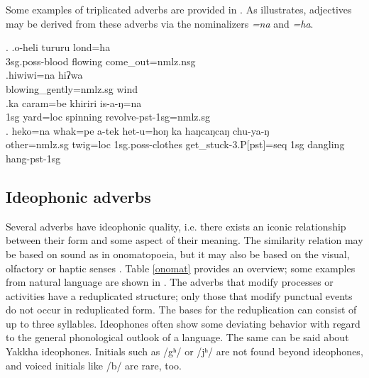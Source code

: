 Some examples of triplicated adverbs are provided in \Next. As \Next[b] illustrates, adjectives may be derived from these adverbs via the nominalizers \emph{=na} and \emph{=ha}.  

 \ex. \ag.o-heli tururu lond=ha\\	
	{\sc 3sg.poss}-blood flowing	come\_out{\sc [pst]=nmlz.nsg}	\\
	 \bg.hiwiwi=na hiʔwa\\
	blowing\_gently{\sc =nmlz.sg}	wind\\
	 \bg.ka caram=be khiriri is-a-ŋ=na \\
		{\sc 1sg}	yard{\sc =loc} spinning 	revolve{\sc -pst-1sg=nmlz.sg}\\
	 \bg. heko=na         whak=pe      a-tek              het-u=hoŋ              ka  haŋcaŋcaŋ chu-ya-ŋ\\
	other{\sc =nmlz.sg} twig{\sc =loc} {\sc 1sg.poss-}clothes get\_stuck{\sc -3.P[pst]=seq} {\sc 1sg} dangling hang{\sc -pst-1sg}\\
	  
	
\subsection{Ideophonic adverbs}\label{sec-ideophone}

Several adverbs have ideophonic quality, i.e. there exists an iconic relationship between their form and some aspect of their meaning. The similarity relation may be based on sound as in onomatopoeia, but it may also be based on the visual, olfactory or haptic senses \citep{Caughley1997_Vowel}. Table \ref{onomat} provides an overview; some examples from natural language are shown in  \Next. The adverbs that modify processes or activities have a reduplicated structure; only those that modify punctual events do not occur in reduplicated form. The bases for the reduplication can consist of up to three syllables. Ideophones often show some deviating behavior with regard to the general phonological outlook of a language. The same can be said about Yakkha ideophones. Initials such as /gʰ/ or /jʰ/ are not found beyond ideophones, and voiced initials like /b/ are rare, too.


